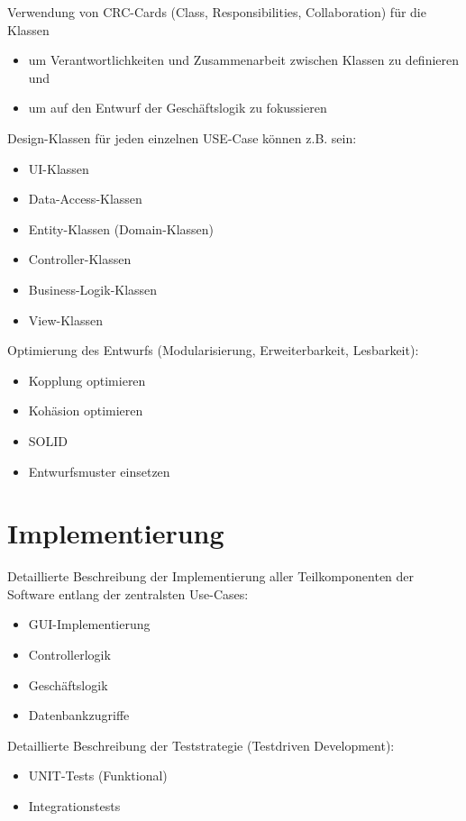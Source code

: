 Verwendung von CRC-Cards (Class, Responsibilities, Collaboration) für die Klassen
\begin{itemize}
	\item um Verantwortlichkeiten und Zusammenarbeit zwischen Klassen zu definieren und
	\item um auf den Entwurf der Geschäftslogik zu fokussieren
\end{itemize}

Design-Klassen für jeden einzelnen USE-Case können z.B. sein:

\begin{itemize}
	\item UI-Klassen
	\item Data-Access-Klassen
	\item Entity-Klassen (Domain-Klassen)
	\item Controller-Klassen
	\item Business-Logik-Klassen
	\item View-Klassen
\end{itemize}

Optimierung des Entwurfs (Modularisierung, Erweiterbarkeit, Lesbarkeit):

\begin{itemize}
	\item Kopplung optimieren
	\item Kohäsion optimieren
	\item SOLID
	\item Entwurfsmuster einsetzen
\end{itemize}

\chapter{Implementierung}
Detaillierte Beschreibung der Implementierung aller Teilkomponenten der Software entlang der zentralsten Use-Cases:

\begin{itemize}
	\item GUI-Implementierung
	\item Controllerlogik
	\item Geschäftslogik
	\item Datenbankzugriffe
\end{itemize}

Detaillierte Beschreibung der Teststrategie (Testdriven Development):

\begin{itemize}
	\item UNIT-Tests (Funktional)
	\item Integrationstests
\end{itemize}


